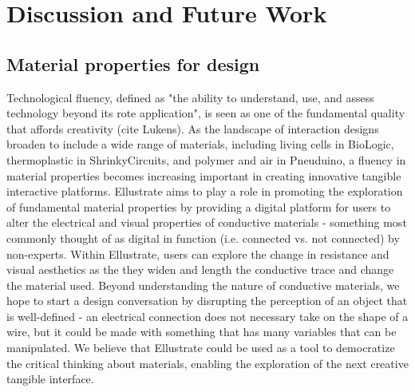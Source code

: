 \documentclass{sigchi}
\begin{document}
\section {Discussion and Future Work}

\subsection{Material properties for design}

Technological fluency, defined as "the ability to understand, use, and assess technology beyond its rote application", is seen as one of the fundamental quality that affords creativity (cite Lukens). As the landscape of interaction designs broaden to include a wide range of materials, including living cells in BioLogic, thermoplastic in ShrinkyCircuits, and polymer and air in Pneuduino, a fluency in material properties becomes increasing important in creating innovative tangible interactive platforms. Ellustrate aims to play a role in promoting the exploration of fundamental material properties by providing a digital platform for users to alter the electrical and visual properties of conductive materials - something most commonly thought of as digital in function (i.e. connected vs. not connected) by non-experts. Within Ellustrate, users can explore the change in resistance and visual aesthetics as the they widen and length the conductive trace and change the material used. Beyond understanding the nature of conductive materials, we hope to start a design conversation by disrupting the perception of an object that is well-defined - an electrical connection does not necessary take on the shape of a wire, but it could be made with something that has many variables that can be manipulated. We believe that Ellustrate could be used as a tool to democratize the critical thinking about materials, enabling the exploration of the next creative tangible interface. 


\end{document}
